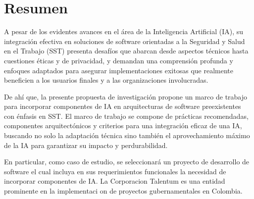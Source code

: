 
\section*{Resumen}
A pesar de los evidentes avances en el área de la Inteligencia Artificial (IA), su integración efectiva en soluciones de software orientadas a la Seguridad y Salud en el Trabajo (SST) presenta desafíos que abarcan desde aspectos técnicos hasta cuestiones éticas y de privacidad, y demandan una comprensión profunda y enfoques adaptados para asegurar implementaciones exitosas que realmente beneficien a los usuarios finales y a las organizaciones involucradas.

De ahí que, la presente propuesta de investigación propone un marco de trabajo para incorporar componentes de IA en arquitecturas de software preexistentes con énfasis en SST. El marco de trabajo se compone de prácticas recomendadas, componentes arquitectónicos y criterios para una integración eficaz de una IA, buscando no solo la adaptación técnica sino también el aprovechamiento máximo de la IA para garantizar su impacto y perdurabilidad. 

En particular, como caso de estudio, se seleccionará un proyecto de desarrollo de software el cual incluya en sus requerimientos funcionales la necesidad de incorporar componentes de IA. La Corporacion Talentum es una
entidad prominente en la implementaci on de proyectos gubernamentales en
Colombia.




